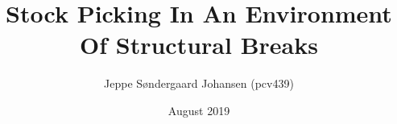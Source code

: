 \documentclass{article}
\title{Stock Picking In An Environment Of Structural Breaks}
\author{Jeppe Søndergaard Johansen (pcv439)}
\date{August 2019}
\begin{document}


\maketitle




\pagebreak

\tableofcontents

\pagebreak



















\newpage
\printbibliography

\newpage

\end{document}
